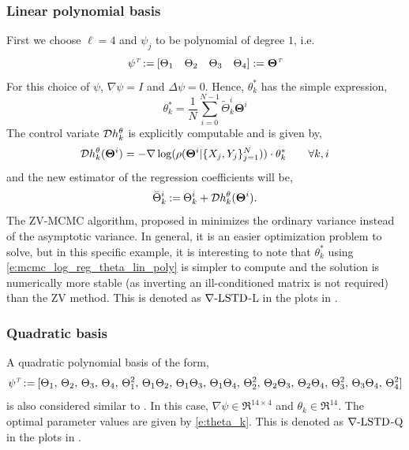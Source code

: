 \noindent \subsubsection*{Linear polynomial basis}
First we choose $\ell=4$ and $\psi_j$ to be polynomial of degree $1$, i.e.
\begin{equation}
\psi^\transpose \eqdef [ \Theta_1 \quad \Theta_2 \quad \Theta_3 \quad \Theta_4] := \boldsymbol{\Theta}^\transpose
\label{e:mcmc_log_reg_linear}
\end{equation}
For this choice of $\psi$,  $\nabla \psi = I$ and $ \Delta \psi = 0$. Hence, $\theta^*_k$ has the simple expression,
\begin{equation}
\theta^*_k = \frac{1}{N} \sum_{i=0}^{N-1} \tilde{\Theta}_k^i \boldsymbol{\Theta}^i
\label{e:mcmc_log_reg_theta_lin_poly}
\end{equation}
The control variate ${\cal D} h^\theta_k$ is explicitly computable and is given by,
\[
{\cal D} h^\theta_k(\boldsymbol{\Theta}^i) = -\nabla \log(\rho(\boldsymbol{\Theta}^i|\{X_j,Y_j\}_{j=1}^N)) \cdot \theta^*_k \qquad \forall k, i
\]
and the new estimator of the regression coefficients will be,
\[
\bar{\Theta}^i_k \mathbin{:=} \Theta^i_k + {\cal D} h^\theta_k(\boldsymbol{\Theta}^i).
\]
The ZV-MCMC algorithm, proposed in \cite{papmirgir14} minimizes the ordinary variance instead of the asymptotic variance. In general, it is an easier optimization problem to solve, but in this specific example, it is interesting to note that $\theta_k^*$  using \eqref{e:mcmc_log_reg_theta_lin_poly} is simpler to compute and the solution is numerically more stable (as inverting an ill-conditioned matrix is not required) than the ZV method. This is denoted as $\nabla\text{-LSTD}$-L in the plots in . 

\noindent \subsubsection*{Quadratic basis}
A quadratic polynomial basis of the form,
\begin{equation}
\psi^\transpose \eqdef [\Theta_1, \, \Theta_2, \, \Theta_3, \, \Theta_4, \, \Theta_1^2, \, \Theta_1 \Theta_2, \, \Theta_1\Theta_3, \, \Theta_1 \Theta_4, \, \Theta_2^2, \, \Theta_2\Theta_3, \, \Theta_2\Theta_4, \, \Theta_3^2, \, \Theta_3 \Theta_4, \, \Theta_4^2] 
\label{e:mcmc_log_reg_quadratic}
\end{equation}
is also considered similar to \cite{papmirgir14}.  In this case, $\nabla \psi \in \Re^{14 \times 4}$ and $\theta_k \in \Re^{14}$. The optimal parameter values are given by \eqref{e:theta_k}. This is denoted as $\nabla\text{-LSTD}$-Q in the plots in .


